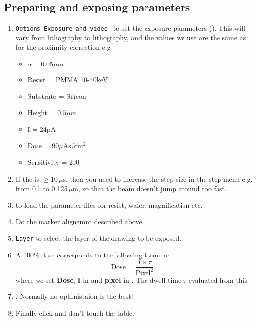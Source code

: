  \subsection{Preparing and exposing parameters}
 \begin{enumerate}
 	\item \texttt{Options \ra Exposure and video \ra {}} to set the exposure parameters (). This will vary from lithography to lithography, and the values we use are the same as for the proximity correction e.g.
 	\begin{itemize}
 		\item $\alpha=0.05\mu m$
 		\item Resist = PMMA 10-40keV
 		\item Substrate = Silicon
 		\item Height = $0.5\mu m$
 		\item I = 24pA
 		\item Dose = 90$ \mu $As/cm$ ^{2} $
 		\item Sensitivity = 200
 	\end{itemize}
 	\item If the  is  $ \ge 10\, \mu$s, then you need to increase the step size in the step menu e.g. from 0.1 to 0.125$ \,\mu $m, so that the beam doesn't jump around too fast.
 	\item {} to load the parameter files for resist, wafer, magnification etc. 
 	\item Do the marker alignemnt described above
 	\item \texttt{Layer} to select the layer of the drawing to be exposed.
 	\item A 100\% dose corresponds to the following formula:
 	\begin{equation}
 	\text{Dose} = \frac{I\times \tau}{\text{Pixel}^{2}},
 	\end{equation}
 	\noindent where we set \textbf{Dose}, \textbf{I} in  and \textbf{pixel} in . The dwell time $ \tau $ evaluated from this 
 	\item {}. Normally no optimistaion is the best!
 	\item Finally click  and don't touch the table.
 \end{enumerate}
 
